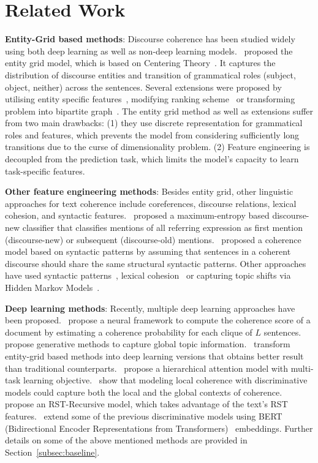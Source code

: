 \documentclass[11pt]{article}
\begin{document}
\section{Related Work}
\label{sec:related}
\noindent\textbf{Entity-Grid based methods}: Discourse coherence has been studied widely using both deep learning as well as non-deep learning models.~\cite{barzilay2008modeling} proposed the entity grid model, which is based on Centering Theory~\cite{grosz1995centering}. It captures the distribution of discourse entities and transition of grammatical roles (subject, object, neither) across the sentences. Several extensions were proposed by utilising entity specific features~\cite{elsner2008coreference}, modifying ranking scheme~\cite{feng2012extending} or transforming problem into bipartite graph~\cite{mesgar2015graph}. The entity grid method as well as extensions suffer from two main drawbacks: (1) they use discrete representation for grammatical roles and features, which prevents the model from considering sufficiently long transitions due to the curse of dimensionality problem. (2) Feature engineering is decoupled from the prediction task, which limits the model's capacity to learn task-specific features. 

\noindent\textbf{Other feature engineering methods}: Besides entity grid, other linguistic approaches for text coherence include coreferences, discourse relations, lexical cohesion, and syntactic features.~\cite{elsner2008coreference} proposed a maximum-entropy based discourse-new classifier that classifies mentions of all referring expression as first mention (discourse-new) or subsequent (discourse-old) mentions.~\cite{louis2012coherence} proposed a coherence model based on syntactic patterns by assuming that sentences in a coherent discourse should share the same structural syntactic patterns. Other approaches have used syntactic patterns~\cite{louis2012coherence}, lexical cohesion~\cite{morris1991lexical,somasundaran2014lexical} or capturing topic shifts via Hidden Markov Models~\cite{barzilay2004catching}.

\noindent\textbf{Deep learning methods}: Recently, multiple deep learning approaches have been proposed.~\cite{li2014model} propose a neural framework to compute the coherence score of a document by estimating a coherence probability for each clique of $L$ sentences. \cite{li2017neural} propose generative methods to capture global topic information.~\cite{nguyen2017neural,mohiuddin2018coherence} transform entity-grid based methods into deep learning versions that obtains better result than traditional counterparts.~\cite{farag2019multi} propose a hierarchical attention model with multi-task learning objective.~\cite{xu2019cross,moon2019unified} show that modeling local coherence with discriminative models could capture both the local and the global contexts of coherence.~\cite{guz2020neural} propose an RST-Recursive model, which takes advantage of the text's RST features.~\cite{farag2020analyzing} extend some of the previous discriminative models using BERT (Bidirectional Encoder Representations from Transformers)~\cite{devlin2018bert} embeddings. Further details on some of the above mentioned methods are provided in Section~\ref{subsec:baseline}. 
\end{document}
